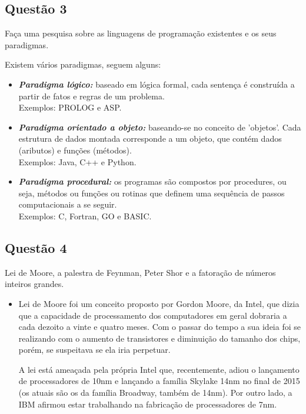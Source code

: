 \documentclass{article}
\begin{document}
\subsection*{Questão 3}
Faça uma pesquisa sobre as linguagens de programação existentes e os seus
paradigmas. \par Existem vários paradigmas, seguem alguns:
        \begin{itemize}
        \item \textit{\textbf{Paradigma lógico:}} baseado em lógica formal,
            cada sentença é construída a partir de fatos e regras de um
                problema. \\
        Exemplos: PROLOG e ASP.
        \end{itemize}
        
        \begin{itemize}
        \item \textit{\textbf{Paradigma orientado a objeto:}} baseando-se no
            conceito de 'objetos'. Cada estrutura de dados montada corresponde
                a um objeto, que contém dados (aributos) e funções (métodos).
                \\
        Exemplos: Java, C++ e Python.
        \end{itemize}
        
        \begin{itemize}
        \item \textit{\textbf{Paradigma procedural:}} os programas são
            compostos por procedures, ou seja, métodos ou funções ou rotinas
                que definem uma sequência de passos computacionais a se seguir.
                \\
        Exemplos: C, Fortran, GO e BASIC.
        \end{itemize}

\subsection*{Questão 4}
Lei de Moore, a palestra de Feynman, Peter Shor e a fatoração de números
inteiros grandes.
        \begin{itemize}
        \item Lei de Moore foi um conceito proposto por Gordon Moore, da Intel,
            que dizia que a capacidade de processamento dos computadores em
                geral dobraria a cada dezoito a vinte e quatro meses. Com o
                passar do tempo a sua ideia foi se realizando com o aumento de
                transistores e diminuição do tamanho dos chips, porém, se
                suspeitava se ela iria perpetuar. \par

A lei está ameaçada pela própria Intel que, recentemente, adiou o lançamento de
                processadores de 10nm e lançando a família Skylake 14nm no
                final de 2015 (os atuais são os da família Broadway, também de
                14nm). Por outro lado, a IBM afirmou estar trabalhando na
                fabricação de processadores de 7nm.
        \end{itemize}
        
\end{document}
